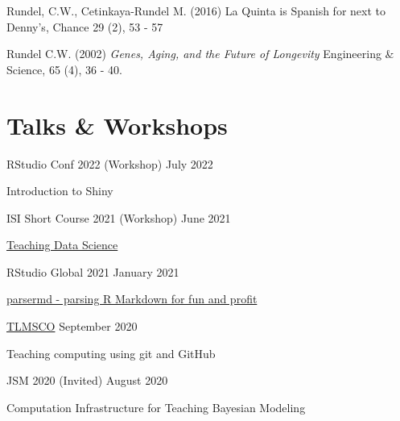 \documentclass[margin,line]{res}
\begin{document}
\begin{resume}
Rundel, C.W., Cetinkaya-Rundel M. (2016) La Quinta is Spanish for next to Denny's, Chance 29 (2), 53 - 57


Rundel C.W. (2002) {\em Genes, Aging, and the Future of Longevity} Engineering \& Science, 65 (4), 36 - 40.

\vspace{4mm}

%

\pagebreak

\section{\sc Talks \& Workshops}


RStudio Conf 2022 (Workshop) \hfill July 2022
\begin{list1}
\item[] Introduction to Shiny
\end{list1}
\vspace{-3mm}

ISI Short Course 2021 (Workshop) \hfill June 2021
\begin{list1}
\item[] \href{https://mine-cetinkaya-rundel.github.io/teach-ds-wsc-2021/}{Teaching Data Science}
\end{list1}
\vspace{-3mm}

RStudio Global 2021 \hfill January 2021
\begin{list1}
\item[] \href{https://www.rstudio.com/resources/rstudioglobal-2021/parsermd-parsing-r-markdown-for-fun-and-profit/}{parsermd - parsing R Markdown for fun and profit}
\end{list1}
\vspace{-3mm}

\href{https://sites.google.com/view/rssteachingstatisticssig/research-meetings/teaching-and-learning-of-maths-and-stats-computing-online}{TLMSCO} \hfill September 2020
\begin{list1}
\item[] Teaching computing using git and GitHub
\end{list1}
\vspace{-3mm}

JSM 2020 (Invited) \hfill August 2020
\begin{list1}
\item[] Computation Infrastructure for Teaching Bayesian Modeling
\end{list1}
\vspace{-3mm}


\end{resume}
\end{document}
